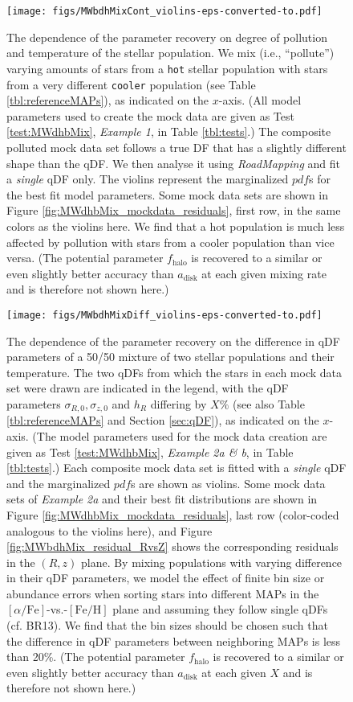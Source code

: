 \documentclass[iop,revtex4,numberedappendix,appendixfloats]{emulateapj}
\newcommand{\pdf}{\ensuremath{pdf}}
\newcommand{\MAPs}{MAPs}
\newcommand{\RM}{{\sl RoadMapping}}
\begin{document}
\begin{figure}[!htbp]
\centering
\texttt{[image: figs/MWbdhMixCont\_violins-eps-converted-to.pdf]}
\caption{The dependence of the parameter recovery on degree of pollution and temperature of the stellar population. We mix (i.e., ``pollute'') varying amounts of stars from a \texttt{hot} stellar population with stars from a very different \texttt{cooler} population (see Table \ref{tbl:referenceMAPs}), as indicated on the $x$-axis. (All model parameters used to create the mock data are given as Test \ref{test:MWdhbMix}, \emph{Example 1}, in Table \ref{tbl:tests}.) The composite polluted mock data set follows a true DF that has a slightly different shape than the qDF. We then analyse it using \RM{} and fit a \emph{single} qDF only. The violins represent the marginalized \pdf{}s for the best fit model parameters. Some mock data sets are shown in Figure \ref{fig:MWdhbMix_mockdata_residuals}, first row, in the same colors as the violins here. We find that a hot population is much less affected by pollution with stars from a cooler population than vice versa. (The potential parameter $f_\text{halo}$ is recovered to a similar or even slightly better accuracy than $a_\text{disk}$ at each given mixing rate and is therefore not shown here.)}
\label{fig:MWdhbMixCont}
\end{figure}

\begin{figure}[!htbp]
\centering
\texttt{[image: figs/MWbdhMixDiff\_violins-eps-converted-to.pdf]}
\caption{The dependence of the parameter recovery on the difference in qDF parameters of a 50/50 mixture of two stellar populations and their temperature. The two qDFs from which the stars in each mock data set were drawn are indicated in the legend, with the qDF parameters $\sigma_{R,0}, \sigma_{z,0}$ and $h_R$ differing by $X\%$ (see also Table \ref{tbl:referenceMAPs} and Section \ref{sec:qDF}), as indicated on the $x$-axis. (The model parameters used for the mock data creation are given as Test \ref{test:MWdhbMix}, \emph{Example 2a \& b}, in Table \ref{tbl:tests}.) Each composite mock data set is fitted with a \emph{single} qDF and the marginalized \pdf{}s are shown as violins. Some mock data sets of \emph{Example 2a} and their best fit distributions are shown in Figure \ref{fig:MWdhbMix_mockdata_residuals}, last row (color-coded analogous to the violins here), and Figure \ref{fig:MWbdhMix_residual_RvsZ} shows the corresponding residuals in the $(R,z)$ plane. By mixing populations with varying difference in their qDF parameters, we model the effect of finite bin size or abundance errors when sorting stars into different \MAPs{} in the $[\alpha/\mathrm{Fe}]$-vs.-$[\mathrm{Fe}/\mathrm{H}]$ plane and assuming they follow single qDFs (cf. BR13). We find that the bin sizes should be chosen such that the difference in qDF parameters between neighboring \MAPs{} is less than 20\%. (The potential parameter $f_\text{halo}$ is recovered to a similar or even slightly better accuracy than $a_\text{disk}$ at each given $X$ and is therefore not shown here.)} 
\label{fig:MWdhbMixDiff}
\end{figure}
\end{document}
